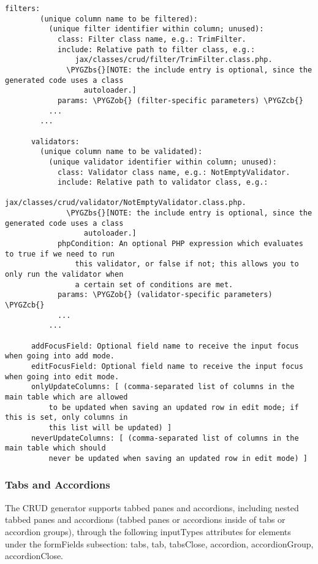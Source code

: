 \documentclass[letterpaper,10pt,english]{sphinxmanual}
\def\PYGZbs{\char`\\}
\def\PYGZob{\char`\{}
\def\PYGZcb{\char`\}}
\begin{document}
\begin{Verbatim}[commandchars=\\\{\}]
      filters:
        (unique column name to be filtered):
          (unique filter identifier within column; unused):
            class: Filter class name, e.g.: TrimFilter.
            include: Relative path to filter class, e.g.:
                jax/classes/crud/filter/TrimFilter.class.php.
              \PYGZbs{}[NOTE: the include entry is optional, since the generated code uses a class
                  autoloader.]
            params: \PYGZob{} (filter-specific parameters) \PYGZcb{}
          ...
        ...

      validators:
        (unique column name to be validated):
          (unique validator identifier within column; unused):
            class: Validator class name, e.g.: NotEmptyValidator.
            include: Relative path to validator class, e.g.:
                jax/classes/crud/validator/NotEmptyValidator.class.php.
              \PYGZbs{}[NOTE: the include entry is optional, since the generated code uses a class
                  autoloader.]
            phpCondition: An optional PHP expression which evaluates to true if we need to run
                this validator, or false if not; this allows you to only run the validator when
                a certain set of conditions are met.
            params: \PYGZob{} (validator-specific parameters) \PYGZcb{}
            ...
          ...

      addFocusField: Optional field name to receive the input focus when going into add mode.
      editFocusField: Optional field name to receive the input focus when going into edit mode.
      onlyUpdateColumns: [ (comma-separated list of columns in the main table which are allowed
          to be updated when saving an updated row in edit mode; if this is set, only columns in
          this list will be updated) ]
      neverUpdateColumns: [ (comma-separated list of columns in the main table which should
          never be updated when saving an updated row in edit mode) ]
\end{Verbatim}


\subsubsection{Tabs and Accordions}
\label{jaxFrameworkGuide:tabs-and-accordions}
The CRUD generator supports tabbed panes and accordions, including nested tabbed panes and
accordions (tabbed panes or accordions inside of tabs or accordion groups), through the following
inputTypes attributes for elements under the formFields subsection: tabs, tab, tabsClose, accordion,
accordionGroup, accordionClose.
\end{document}
